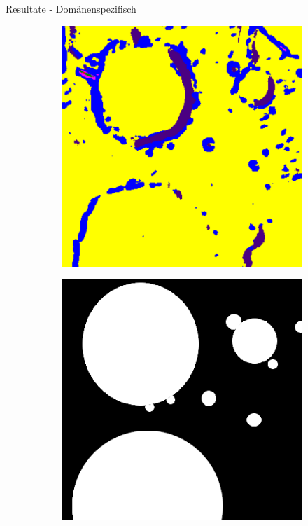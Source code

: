 \documentclass{beamer}
\begin{document}
\begin{frame}[allowframebreaks]{Resultate - Domänenspezifisch}
\begin{minipage}{0.38\textwidth}
\begin{figure}[h!]
\begin{subfigure}[t]{0.31\textwidth}
			\end{subfigure}
			\begin{subfigure}[t]{0.31\textwidth}
				\includegraphics[width=\linewidth,keepaspectratio]{gfx/rob_res/thm_dir_N-30_210.png_tile_60.png}
			\end{subfigure}
			\begin{subfigure}[t]{0.31\textwidth}
			\includegraphics[width=\linewidth,keepaspectratio]{gfx/rob_hum/thm_dir_N-30_210.png_tile_60.png}

\end{subfigure}
\end{figure}
\end{minipage}
\end{frame}
\end{document}
